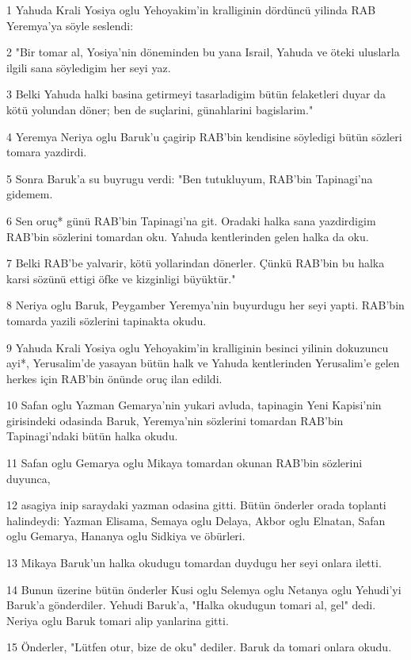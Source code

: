 \par 1 Yahuda Krali Yosiya oglu Yehoyakim'in kralliginin dördüncü yilinda RAB Yeremya'ya söyle seslendi:
\par 2 "Bir tomar al, Yosiya'nin döneminden bu yana Israil, Yahuda ve öteki uluslarla ilgili sana söyledigim her seyi yaz.
\par 3 Belki Yahuda halki basina getirmeyi tasarladigim bütün felaketleri duyar da kötü yolundan döner; ben de suçlarini, günahlarini bagislarim."
\par 4 Yeremya Neriya oglu Baruk'u çagirip RAB'bin kendisine söyledigi bütün sözleri tomara yazdirdi.
\par 5 Sonra Baruk'a su buyrugu verdi: "Ben tutukluyum, RAB'bin Tapinagi'na gidemem.
\par 6 Sen oruç* günü RAB'bin Tapinagi'na git. Oradaki halka sana yazdirdigim RAB'bin sözlerini tomardan oku. Yahuda kentlerinden gelen halka da oku.
\par 7 Belki RAB'be yalvarir, kötü yollarindan dönerler. Çünkü RAB'bin bu halka karsi sözünü ettigi öfke ve kizginligi büyüktür."
\par 8 Neriya oglu Baruk, Peygamber Yeremya'nin buyurdugu her seyi yapti. RAB'bin tomarda yazili sözlerini tapinakta okudu.
\par 9 Yahuda Krali Yosiya oglu Yehoyakim'in kralliginin besinci yilinin dokuzuncu ayi*, Yerusalim'de yasayan bütün halk ve Yahuda kentlerinden Yerusalim'e gelen herkes için RAB'bin önünde oruç ilan edildi.
\par 10 Safan oglu Yazman Gemarya'nin yukari avluda, tapinagin Yeni Kapisi'nin girisindeki odasinda Baruk, Yeremya'nin sözlerini tomardan RAB'bin Tapinagi'ndaki bütün halka okudu.
\par 11 Safan oglu Gemarya oglu Mikaya tomardan okunan RAB'bin sözlerini duyunca,
\par 12 asagiya inip saraydaki yazman odasina gitti. Bütün önderler orada toplanti halindeydi: Yazman Elisama, Semaya oglu Delaya, Akbor oglu Elnatan, Safan oglu Gemarya, Hananya oglu Sidkiya ve öbürleri.
\par 13 Mikaya Baruk'un halka okudugu tomardan duydugu her seyi onlara iletti.
\par 14 Bunun üzerine bütün önderler Kusi oglu Selemya oglu Netanya oglu Yehudi'yi Baruk'a gönderdiler. Yehudi Baruk'a, "Halka okudugun tomari al, gel" dedi. Neriya oglu Baruk tomari alip yanlarina gitti.
\par 15 Önderler, "Lütfen otur, bize de oku" dediler. Baruk da tomari onlara okudu.

